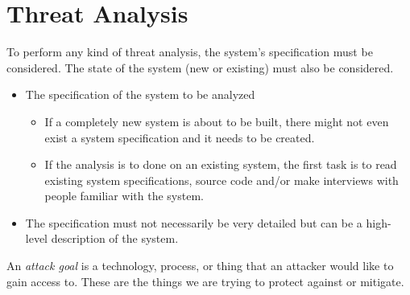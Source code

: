 \section{Threat Analysis}\label{sec:Threat_Analysis}
To perform any kind of threat analysis, the system's specification must be considered.
The state of the system (new or existing) must also be considered.
\begin{itemize}[noitemsep]
\item The specification of the system to be analyzed
  \begin{itemize}[noitemsep]
  \item If a completely new system is about to be built, there might not even exist a system specification and it needs to be created.
  \item If the analysis is to done on an existing system, the first task is to read existing system specifications, source code and/or make interviews with people familiar with the system.
  \end{itemize}

\item The specification must not necessarily be very detailed but can be a high-level description of the system.
\end{itemize}

\begin{definition}\label{def:Attack_Goal}
  An \emph{attack goal} is a technology, process, or thing that an attacker would like to gain access to.
  These are the things we are trying to protect against or mitigate.
\end{definition}







